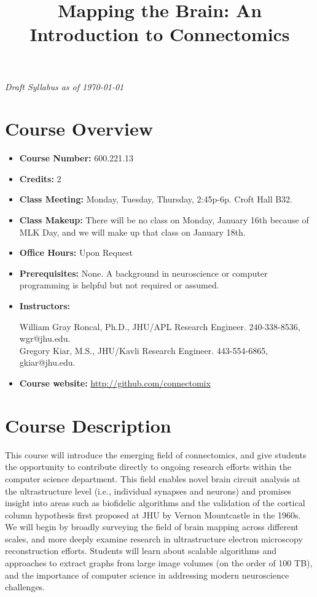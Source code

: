 \documentclass[12pt]{article}
\title{Mapping the Brain:  An Introduction to Connectomics}
\date{}
\begin{document}
\vspace{-0.5cm}
\maketitle
\vspace{-2cm}
\begin{center}\textit{Draft Syllabus as of \today}\end{center}

\section*{Course Overview}
\begin{itemize}[noitemsep]
\item{\textbf{Course Number:}  600.221.13}
\item{\textbf{Credits:} 2 }
\item{\textbf{Class Meeting:}  Monday, Tuesday, Thursday, 2:45p-6p. Croft Hall	B32.}
\item{\textbf{Class Makeup:} There will be no class on Monday, January 16th because of MLK Day, and we will make up that class on January 18th.}
\item{\textbf{Office Hours:}  Upon Request}
\item{\textbf{Prerequisites:} None.  A background in neuroscience or computer programming is helpful but not required or assumed.}
\item{\textbf{Instructors:}

William Gray Roncal, Ph.D., JHU/APL Research Engineer.  240-338-8536, wgr@jhu.edu.\\
Gregory Kiar, M.S., JHU/Kavli Research Engineer. 443-554-6865, gkiar@jhu.edu.}
\item{\textbf{Course website:}  \url{http://github.com/connectomix}  }
\end{itemize}

\section*{Course Description} 
This course will introduce the emerging field of connectomics, and give students the opportunity to contribute directly to ongoing research efforts within the computer science department.  This field enables novel brain circuit analysis at the ultrastructure level (i.e., individual synapses and neurons) and promises insight into areas such as biofidelic algorithms and the validation of the cortical column hypothesis first proposed at JHU by Vernon Mountcastle in the 1960s.  We will begin by broadly surveying the field of brain mapping across  different scales, and more deeply examine research in ultrastructure electron microscopy reconstruction efforts.  Students will learn about scalable algorithms and approaches to extract graphs from large image volumes (on the order of 100 TB), and the importance of computer science in addressing modern neuroscience challenges.  
\end{document}
